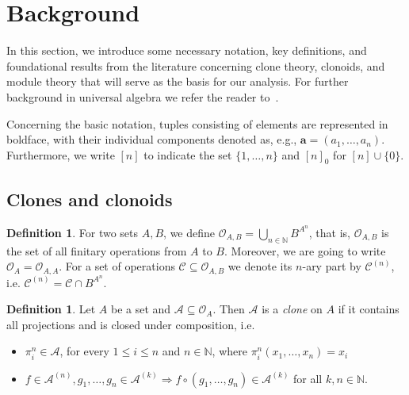 \documentclass[11pt]{amsart}
\theoremstyle{plain}
\theoremstyle{definition}
\newtheorem{definition}[thm]{Definition}
\newcommand{\N}{{\mathbb N}}
\newcommand{\alg}[1]{\mathbf{#1}}
\newcommand{\clone}[1]{\mathcal{#1}}
\newcommand{\clonoid}[1]{\mathcal{#1}}
\newcommand{\clodC}{\clonoid{C}}
\newcommand{\clodO}{\clonoid{O}}
\newcommand{\algA}{\alg{A}}
\newcommand{\algB}{\alg{B}}
\newcommand{\cloA}{\clone{A}}
\DeclareMathOperator{\Clo}{\mathsf{Clo}}
\newcommand{\ste}[1]{\textcolor{green}{ #1}}
\begin{document}
\section{Background}\label{sec:prel}

In this section, we introduce some necessary notation, key definitions, and foundational results from the literature concerning clone theory, clonoids, and module theory that will serve as the basis for our analysis. For further background in universal algebra we refer the reader to~\cite{BS-universal-algebra}.

Concerning the basic notation, tuples consisting of elements are represented in boldface, with their individual components denoted as, e.g., $\boldsymbol{a}=(a_1,\dots,a_n)$. Furthermore, we write $[n]$ to indicate the set $\{1,\dots,n\}$ and $[n]_0$ for $[n] \cup \{0\}$. 


\subsection{Clones and clonoids}\label{sec:cloclon}

\begin{definition}
For two sets $A, B$, we define $\clodO_{A,B} = \bigcup_{n \in \N} B^{A^n}$, that is, $\clodO_{A,B}$ is the set of all finitary operations from $A$ to $B$. Moreover, we are going to write $\clodO_A = \clodO_{A,A}$. For a set of operations $\clodC \subseteq \clodO_{A,B}$ we denote its $n$-ary part by $\clodC^{(n)}$, i.e. $\clodC^{(n)} = \clodC \cap B^{A^n}$.
\end{definition}


\begin{definition}
Let $A$ be a set and $\cloA \subseteq \clodO_A$. 
Then $\cloA$ is a \emph{clone} on $A$ 
if it contains all projections and 
is closed under composition, i.e.
\begin{itemize}
\item $\pi_i^n \in \cloA$, for every $1\leq i \leq n$ and $n \in \N$, where $\pi_i^n(x_1,\ldots,x_n) = x_i$
\item $f \in \cloA^{(n)}, g_1, \ldots, g_n \in \cloA^{(k)} \Rightarrow f \circ (g_1,\ldots,g_n) \in \cloA^{(k)}$ for all $k,n \in \N$.
\end{itemize}
\end{definition}
\end{document}
